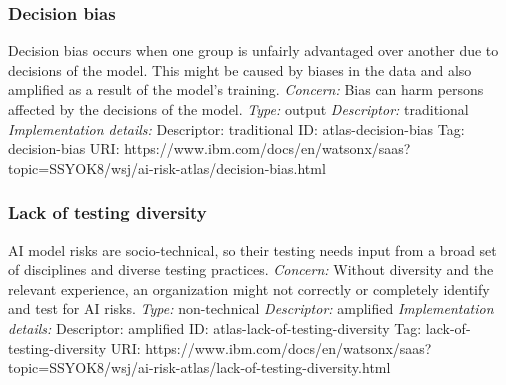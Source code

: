 \documentclass{article}
\begin{document}
\subsubsection*{Decision bias}
Decision bias occurs when one group is unfairly advantaged over another due to decisions of the model. This might be caused by biases in the data and also amplified as a result of the model's training.\newline
\textit{Concern: }Bias can harm persons affected by the decisions of the model.\newline\newline
\textit{Type: }output\newline
\textit{Descriptor: }traditional \newline\newline
\textit{Implementation details:} \newline
Descriptor: traditional \newline
ID: atlas-decision-bias \newline
Tag: decision-bias \newline
URI:  https://www.ibm.com/docs/en/watsonx/saas?topic=SSYOK8/wsj/ai-risk-atlas/decision-bias.html\newline
\subsubsection*{Lack of testing diversity}
AI model risks are socio-technical, so their testing needs input from a broad set of disciplines and diverse testing practices.\newline
\textit{Concern: }Without diversity and the relevant experience, an organization might not correctly or completely identify and test for AI risks.\newline\newline
\textit{Type: }non-technical\newline
\textit{Descriptor: }amplified \newline\newline
\textit{Implementation details:} \newline
Descriptor: amplified \newline
ID: atlas-lack-of-testing-diversity \newline
Tag: lack-of-testing-diversity \newline
URI:  https://www.ibm.com/docs/en/watsonx/saas?topic=SSYOK8/wsj/ai-risk-atlas/lack-of-testing-diversity.html\newline
\end{document}
